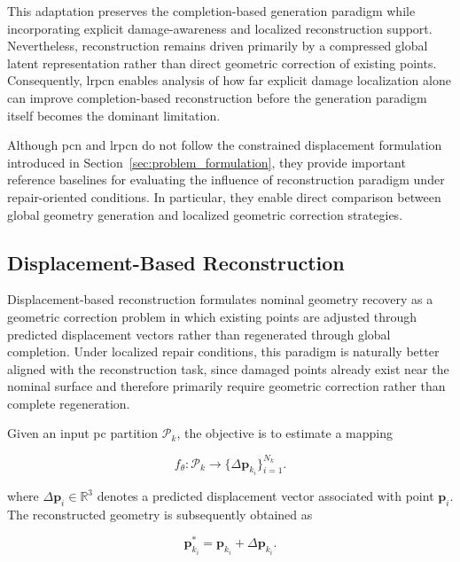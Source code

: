 This adaptation preserves the completion-based generation paradigm while incorporating explicit damage-awareness and localized reconstruction support. Nevertheless, reconstruction remains driven primarily by a compressed global latent representation rather than direct geometric correction of existing points. Consequently, \ac{lrpcn} enables analysis of how far explicit damage localization alone can improve completion-based reconstruction before the generation paradigm itself becomes the dominant limitation.



Although \ac{pcn} and \ac{lrpcn} do not follow the constrained displacement formulation introduced in Section~\ref{sec:problem_formulation}, they provide important reference baselines for evaluating the influence of reconstruction paradigm under repair-oriented conditions. In particular, they enable direct comparison between global geometry generation and localized geometric correction strategies.

\subsection{Displacement-Based Reconstruction}
\label{sec:displacement_methods}

Displacement-based reconstruction formulates nominal geometry recovery as a geometric correction problem in which existing points are adjusted through predicted displacement vectors rather than regenerated through global completion. Under localized repair conditions, this paradigm is naturally better aligned with the reconstruction task, since damaged points already exist near the nominal surface and therefore primarily require geometric correction rather than complete regeneration.

Given an input \ac{pc} partition \(\mathcal{P}_k\), the objective is to estimate a mapping

\begin{equation}
f_{\theta} :
\mathcal{P}_k
\rightarrow
\{\Delta \mathbf{p}_{k_i}\}_{i=1}^{N_k}.
\end{equation}

where $\Delta \mathbf{p}_i \in \mathbb{R}^{3}$ denotes a predicted displacement vector associated with point $\mathbf{p}_i$. The reconstructed geometry is subsequently obtained as

\begin{equation}
\mathbf{p}_{k_i}^{*}
=
\mathbf{p}_{k_i}
+
\Delta \mathbf{p}_{k_i}.
\end{equation}

